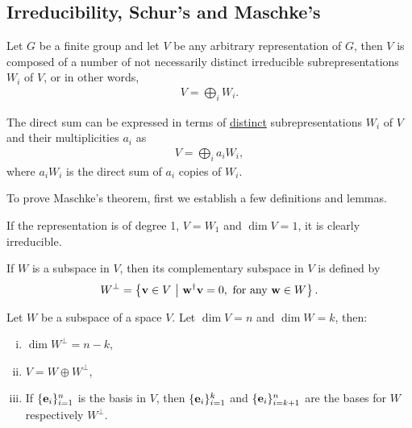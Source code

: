 \subsection{Irreducibility, Schur's and Maschke's}
	
	\begin{theorem}\label{thm:maschke}
		Let $G$ be a finite group and let $V$ be any arbitrary representation of $G$, then $V$ is composed of a number of not necessarily distinct irreducible subrepresentations $W_i$ of $V$, or in other words,
		\begin{align}
			V = \bigoplus_i W_i.
		\end{align}
	\end{theorem}
	
	\begin{note}
		The direct sum can be expressed in terms of \underline{distinct} subrepresentations $W_i$ of $V$ and their multiplicities $a_i$ as
		\begin{align}
			V = \bigoplus_i a_i W_i,
		\end{align}
		where $a_i W_i$ is the direct sum of $a_i$ copies of $W_i$.
	\end{note}
	
	To prove Maschke's theorem, first we establish a few definitions and lemmas.
	
	\begin{corollary}
		If the representation is of degree 1, $V = W_1$ and $\dim V = 1$, it is clearly irreducible.
	\end{corollary}
	
	\begin{definition}
		\cite[12.7]{holst} If $W$ is a subspace in $V$, then its complementary subspace in $V$ is defined by 
		\[
			W^\perp = \left\lbrace \mathbf{v} \in V \ \middle\vert \ \mathbf{w}^\dagger \mathbf{v} = 0, \text{ for any } \mathbf{w} \in W \right\rbrace.
		\]
	\end{definition}
	
	\begin{lemma}\label{lemma:compsubspace}\cite[Thm 12.16]{holst}
		Let $W$ be a subspace of a space $V$. Let $\dim V = n$ and $\dim W = k$, then:
		\noindent
		\begin{enumerate}[i)]
			\setlength\itemsep{-0.5em}
			\item $\dim W^\perp = n - k$,
			\item $V = W \oplus W^\perp$,
			\item If $\{\mathbf{e}_i\}_{i=1}^{n}$ is the basis in $V$, then $\{\mathbf{e}_i\}_{i=1}^{k}$ and $\{\mathbf{e}_i\}_{i=k+1}^{n}$ are the bases for $W$ respectively $W^\perp$.
		\end{enumerate}
	\end{lemma}
	
